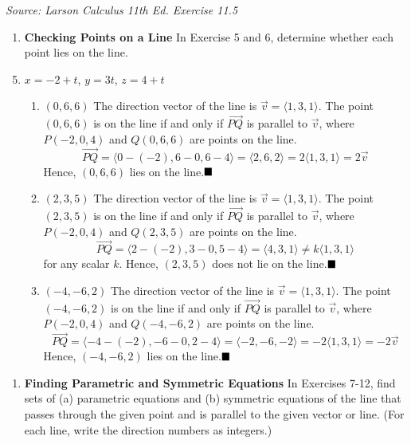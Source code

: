 \textit{Source: Larson Calculus 11th Ed. Exercise 11.5}

\begin{enumerate}[label={}, leftmargin=*]
    \item \textbf{Checking Points on a Line} In Exercise 5 and 6, determine whether each point lies on the line.

\end{enumerate}
\begin{enumerate}
    \setcounter{enumi}{4}
    \item $x = -2 + t$, $y = 3t$, $z = 4 + t$
          \begin{enumerate}
              \item $(0, 6, 6)$
                    \sol{}
                    The direction vector of the line is $\vec{v} = \langle 1, 3, 1 \rangle$. The point $(0, 6, 6)$ is on the line if and only if $\overrightarrow{PQ}$ is parallel to $\vec{v}$, where $P(-2, 0, 4)$ and $Q(0, 6, 6)$ are points on the line. \[\overrightarrow{PQ} = \langle 0 - (-2), 6 - 0, 6 - 4 \rangle = \langle 2, 6, 2 \rangle = 2\langle 1, 3, 1 \rangle = 2\vec{v}\] Hence, $(0, 6, 6)$ lies on the line.$\hfill\blacksquare$
              \item $(2, 3, 5)$
                    \sol{}
                    The direction vector of the line is $\vec{v} = \langle 1, 3, 1 \rangle$. The point $(2, 3, 5)$ is on the line if and only if $\overrightarrow{PQ}$ is parallel to $\vec{v}$, where $P(-2, 0, 4)$ and $Q(2, 3, 5)$ are points on the line. \[\overrightarrow{PQ} = \langle 2 - (-2), 3 - 0, 5 - 4 \rangle = \langle 4, 3, 1 \rangle \neq k\langle 1, 3, 1 \rangle\] for any scalar $k$. Hence, $(2, 3, 5)$ does not lie on the
                    line.$\hfill\blacksquare$
              \item $(-4, -6, 2)$
                    \sol{}
                    The direction vector of the line is $\vec{v} = \langle 1, 3, 1 \rangle$. The point $(-4, -6, 2)$ is on the line if and only if $\overrightarrow{PQ}$ is parallel to $\vec{v}$, where $P(-2, 0, 4)$ and $Q(-4, -6, 2)$ are points on the line. \[\overrightarrow{PQ} = \langle -4 - (-2), -6 - 0, 2 - 4 \rangle = \langle -2, -6, -2 \rangle = -2\langle 1, 3, 1 \rangle = -2\vec{v}\] Hence, $(-4, -6, 2)$ lies on the line.$\hfill\blacksquare$
          \end{enumerate}
\end{enumerate}

\begin{enumerate}[label={}, leftmargin=*]
    \item \textbf{Finding Parametric and Symmetric Equations} In Exercises 7-12, find sets of (a) parametric equations and (b) symmetric equations of the line that passes through the given point and is parallel to the given vector or line. (For each line, write the direction numbers as integers.)
\end{enumerate}

